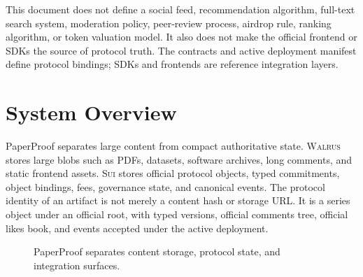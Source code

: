 \documentclass[11pt]{article}
\newcommand{\sui}{\textsc{Sui}}
\newcommand{\walrus}{\textsc{Walrus}}
\begin{document}
This document does not define a social feed, recommendation algorithm, full-text search system, moderation policy, peer-review process, airdrop rule, ranking algorithm, or token valuation model. It also does not make the official frontend or SDKs the source of protocol truth. The contracts and active deployment manifest define protocol bindings; SDKs and frontends are reference integration layers.

\section{System Overview}

PaperProof separates large content from compact authoritative state. \walrus{} stores large blobs such as PDFs, datasets, software archives, long comments, and static frontend assets. \sui{} stores official protocol objects, typed commitments, object bindings, fees, governance state, and canonical events. The protocol identity of an artifact is not merely a content hash or storage URL. It is a series object under an official root, with typed versions, official comments tree, official likes book, and events accepted under the active deployment.

\begin{figure}[htbp]
\centering
{}
\caption{PaperProof separates content storage, protocol state, and integration surfaces.}
\label{fig:overview}
\end{figure}
\end{document}
